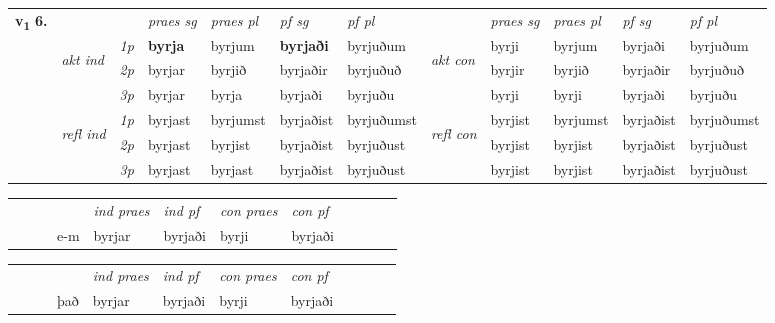 \begin{tabular}{llllllllllll} \toprule
\multirow{4}{*}{{{\textbf{v{\textsubscript{1}}} \Large{\textbf{6.}}}}}  & &   &  \textit{praes sg}  & \textit{praes pl}  &\textit{ pf sg} & \textit{pf pl} &  &  \textit{praes sg}  & \textit{praes pl}  & \textit{pf sg} & \textit{pf pl } \\*
	\cmidrule{4-7} \cmidrule{9-12}
 & \multirow{3}{*}{\begin{turn}{90}\textit{akt ind}\end{turn}} & {\textit{1p}} & \textbf{byrja} & byrjum    & \textbf{byrjaði} & byrjuðum & \multirow{3}{*}{\begin{turn}{90}\textit{akt con}\end{turn}} &byrji & byrjum & byrjaði & byrjuðum\\*
& &  {\textit{2p}} &  byrjar  & byrjið   & byrjaðir & byrjuðuð & & byrjir & byrjið & byrjaðir & byrjuðuð \\*
& &  {\textit{3p}} & byrjar & byrja   & byrjaði & byrjuðu & & byrji & byrji& byrjaði & byrjuðu  \\*
\cmidrule{4-7} \cmidrule{9-12}
 &\multirow{3}{*}{\begin{turn}{90}\textit{refl ind}\end{turn}} & {\textit{1p}} & byrjast & byrjumst    & byrjaðist & byrjuðumst & \multirow{3}{*}{\begin{turn}{90}\textit{refl con}\end{turn}}  &byrjist & byrjumst & byrjaðist & byrjuðumst\\*
 &&  {\textit{2p}} &  byrjast  & byrjist   & byrjaðist & byrjuðust & &byrjist & byrjist & byrjaðist & byrjuðust \\*
& &  {\textit{3p}} & byrjast & byrjast   & byrjaðist & byrjuðust & & byrjist & byrjist& byrjaðist & byrjuðust  \\*
\cmidrule{4-7} \cmidrule{9-12}
\end{tabular}


\begin{tabular}{llllllllllll}
 & &  & &  \textit{ind praes} & \textit{ind pf} & \textit{con praes} & \textit{con pf} \\*
&  & & e-m & byrjar & byrjaði & byrji & byrjaði \\*
\cmidrule{5-9}
\end{tabular}


\begin{tabular}{llllllllllll}
 & &  & &  \textit{ind praes} & \textit{ind pf} & \textit{con praes} & \textit{con pf} \\*
&  & & það & byrjar & byrjaði & byrji & byrjaði \\*
\cmidrule{5-9}
\end{tabular}


